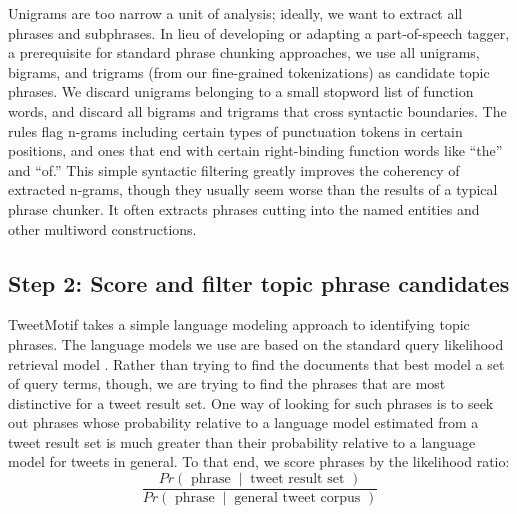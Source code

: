 \documentclass[letterpaper]{article}
\newcommand{\codenote}[1]{}
\begin{document}
Unigrams are too narrow a unit of analysis; ideally, we want to extract all phrases and subphrases.  In lieu of developing or adapting a part-of-speech tagger, a prerequisite for standard phrase chunking approaches, we use all unigrams, bigrams, and trigrams (from our fine-grained tokenizations) as candidate topic phrases.  We discard unigrams belonging to a small stopword list of function words, and discard all bigrams and trigrams that cross syntactic boundaries. The rules flag n-grams including certain types of punctuation tokens in certain positions, and ones that end with certain right-binding function words like ``the'' and ``of.''  This simple syntactic filtering greatly improves the coherency of extracted n-grams, though they usually seem worse than the results of a typical phrase chunker.  It often extracts phrases cutting into the named entities and other multiword constructions.


\subsection{Step 2: Score and filter topic phrase candidates}

\codenote{lang_model.py, ranking.py}
TweetMotif takes a simple language modeling approach to identifying topic phrases.  The language models we use are based on the standard query likelihood retrieval model \cite{manning_introduction_2008}.  Rather than trying to find the documents that best model a set of query terms, though, we are trying to find the phrases that are most distinctive for a tweet result set.  One way of looking for such phrases is to seek out phrases whose probability relative to a language model estimated from a tweet result set is much greater than their probability relative to a language model for tweets in general.  To that end, we score phrases by the likelihood ratio:
\[\frac{Pr(\textrm{ phrase } \ |\ \textrm{ tweet result set })}
{Pr(\textrm{ phrase } \ |\ \textrm{ general tweet corpus })}
\]
\end{document}
